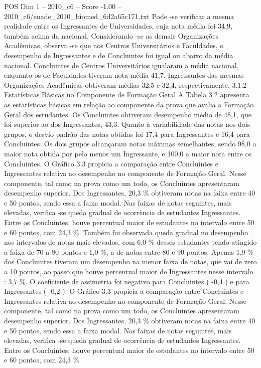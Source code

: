 \begin{textsample}{POS Dim 1 – 2010\_c6 – Score -1.00 – 2010\_c6/enade\_2010\_biomed\_6d2a65c171.txt}
Pode -se verificar a mesma realidade entre os Ingressantes de Universidades, cuja nota média foi 34,9, também acima da nacional.
Considerando -se as demais Organizações Acadêmicas, observa -se que nos Centros Universitários e Faculdades, o desempenho de Ingressantes e de Concluintes foi igual ou abaixo da média nacional.
Concluintes de Centros Universitários igualaram a média nacional, enquanto os de Faculdades tiveram nota média 41,7.
Ingressantes das mesmas Organizações Acadêmicas obtiveram médias 32,5 e 32,4, respectivamente. 3.1.2 Estatísticas Básicas no Componente de Formação Geral A Tabela 3.2 apresenta as estatísticas básicas em relação ao componente da prova que avalia a Formação Geral dos estudantes.
Os Concluintes obtiveram desempenho médio de 48,1, que foi superior ao dos Ingressantes, 43,3.
Quanto à variabilidade das notas nos dois grupos, o desvio padrão das notas obtidas foi 17,4 para Ingressantes e 16,4 para Concluintes.
Os dois grupos alcançaram notas máximas semelhantes, sendo 98,0 a maior nota obtida por pelo menos um Ingressante, e 100,0 a maior nota entre os Concluintes.
O Gráfico 3.3 propicia a comparação entre Concluintes e Ingressantes relativa ao desempenho no componente de Formação Geral.
Nesse componente, tal como na prova como um todo, os Concluintes apresentaram desempenho superior.
Dos Ingressantes, 20,3 \% obtiveram notas na faixa entre 40 e 50 pontos, sendo essa a faixa modal.
Nas faixas de notas seguintes, mais elevadas, verifica -se queda gradual de ocorrência de estudantes Ingressantes.
Entre os Concluintes, houve percentual maior de estudantes no intervalo entre 50 e 60 pontos, com 24,3 \%.
Também foi observada queda gradual no desempenho nos intervalos de notas mais elevados, com 6,0 \% desses estudantes tendo atingido a faixa de 70 a 80 pontos e 1,0 \%, a de notas entre 80 e 90 pontos.
Apenas 1,9 \% dos Concluintes tiveram um desempenho na menor faixa de notas, que vai de zero a 10 pontos, ao passo que houve percentual maior de Ingressantes nesse intervalo : 3,7 \%.
O coeficiente de assimetria foi negativo para Concluintes ( -0,4 ) e para Ingressantes ( -0,2 ).
O Gráfico 3.3 propicia a comparação entre Concluintes e Ingressantes relativa ao desempenho no componente de Formação Geral.
Nesse componente, tal como na prova como um todo, os Concluintes apresentaram desempenho superior.
Dos Ingressantes, 20,3 \% obtiveram notas na faixa entre 40 e 50 pontos, sendo essa a faixa modal.
Nas faixas de notas seguintes, mais elevadas, verifica -se queda gradual de ocorrência de estudantes Ingressantes.
Entre os Concluintes, houve percentual maior de estudantes no intervalo entre 50 e 60 pontos, com 24,3 \%.

\end{textsample}
